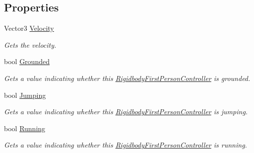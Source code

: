 \subsection*{Properties}
\begin{DoxyCompactItemize}
\item 
Vector3 \hyperlink{class_lerp2_assets_1_1_characters_1_1_first_person_1_1_rigidbody_first_person_controller_ae4fabb355685ddf4e99bea4395e258ad}{Velocity}
\begin{DoxyCompactList}\small\item\em Gets the velocity. \end{DoxyCompactList}\item 
bool \hyperlink{class_lerp2_assets_1_1_characters_1_1_first_person_1_1_rigidbody_first_person_controller_ab78dfe0f8dc88aa643e7c211c7fe3080}{Grounded}
\begin{DoxyCompactList}\small\item\em Gets a value indicating whether this \hyperlink{class_lerp2_assets_1_1_characters_1_1_first_person_1_1_rigidbody_first_person_controller}{Rigidbody\+First\+Person\+Controller} is grounded. \end{DoxyCompactList}\item 
bool \hyperlink{class_lerp2_assets_1_1_characters_1_1_first_person_1_1_rigidbody_first_person_controller_a60b2a73395c067b88dfde24765f1928d}{Jumping}
\begin{DoxyCompactList}\small\item\em Gets a value indicating whether this \hyperlink{class_lerp2_assets_1_1_characters_1_1_first_person_1_1_rigidbody_first_person_controller}{Rigidbody\+First\+Person\+Controller} is jumping. \end{DoxyCompactList}\item 
bool \hyperlink{class_lerp2_assets_1_1_characters_1_1_first_person_1_1_rigidbody_first_person_controller_a4a538e6fa034a9635cbddf3c9e810346}{Running}
\begin{DoxyCompactList}\small\item\em Gets a value indicating whether this \hyperlink{class_lerp2_assets_1_1_characters_1_1_first_person_1_1_rigidbody_first_person_controller}{Rigidbody\+First\+Person\+Controller} is running. \end{DoxyCompactList}\end{DoxyCompactItemize}


